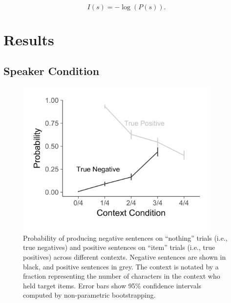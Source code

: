 \documentclass[man, noapacite]{apa2}
\begin{document}
\begin{equation}
\label{eq:surprise}
I(s) = -\log(P(s)).
\end{equation}

\section{Results}

\subsection{Speaker Condition}

\begin{figure}[t]
\begin{center} 
\includegraphics[width=4in]{figures/probs2.pdf}
\caption{\label{fig:speakerprobs} Probability of producing negative sentences on ``nothing'' trials (i.e., true negatives) and positive sentences on ``item'' trials (i.e., true positives) across different contexts. Negative sentences are shown in black, and positive sentences in grey.  The context is notated by a fraction representing the number of characters in the context who held target items. Error bars show 95\% confidence intervals computed by non-parametric bootstrapping.  }
\end{center} 
\end{figure}
\end{document}
